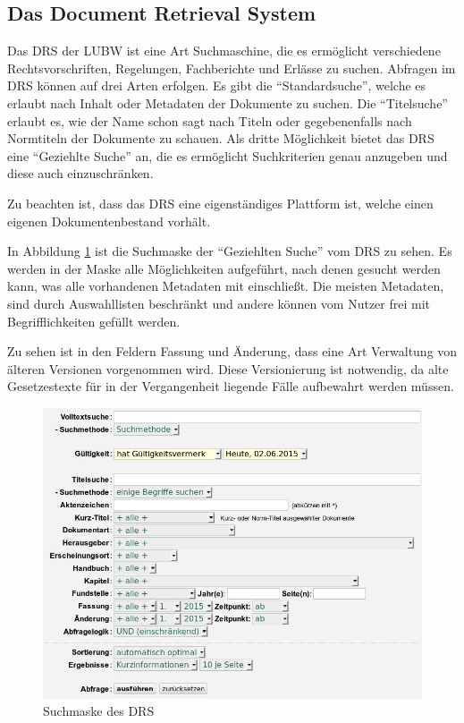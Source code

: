 \subsection{Das Document Retrieval System} \label{DRS}
Das \ac{DRS} der \ac{LUBW} ist eine Art Suchmaschine, die es erm\"oglicht verschiedene Rechtsvorschriften, Regelungen, Fachberichte und Erl\"asse zu suchen. Abfragen im \ac{DRS} k\"onnen auf drei Arten erfolgen. Es gibt die "`Standardsuche"', welche es erlaubt nach Inhalt oder Metadaten der Dokumente zu suchen. Die "`Titelsuche"' erlaubt es, wie der Name schon sagt nach Titeln oder gegebenenfalls nach Normtiteln der Dokumente zu schauen. Als dritte M\"oglichkeit bietet das \ac{DRS} eine "`Geziehlte Suche"' an, die es erm\"oglicht Suchkriterien genau anzugeben und diese auch einzuschr\"anken.
\cite{DRS}

Zu beachten ist, dass das \ac{DRS} eine eigenst\"andiges Plattform ist, welche einen eigenen Dokumentenbestand vorh\"alt.

In Abbildung \ref{Suchmaske DRS} ist die Suchmaske der "`Geziehlten Suche"' vom \ac{DRS} zu sehen. Es werden in der Maske alle M\"oglichkeiten aufgef\"uhrt, nach denen gesucht werden kann, was alle vorhandenen Metadaten mit einschlie\ss{}t. Die meisten Metadaten, sind durch Auswahllisten beschr\"ankt und andere k\"onnen vom Nutzer frei mit Begrifflichkeiten gef\"ullt werden.

Zu sehen ist in den Feldern Fassung und \"Anderung, dass eine Art Verwaltung von \"alteren Versionen vorgenommen wird. Diese Versionierung ist notwendig, da alte Gesetzestexte f\"ur in der Vergangenheit liegende F\"alle aufbewahrt werden m\"ussen.

\begin{figure}[!ht]
\centering
\includegraphics[width=15cm]{Bilder/Suchmaske_DRS.jpg}
\caption{Suchmaske des \ac{DRS}}
\label{Suchmaske DRS}
\centering
\end{figure}


